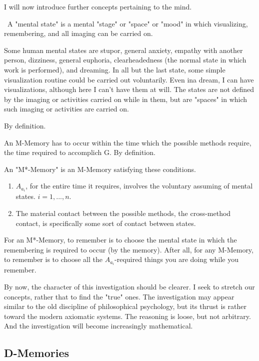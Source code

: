 \documentclass[10pt,twoside,draft]{memoir}
\begin{document}
{{I will now introduce further concepts pertaining to the mind. 

\ A "mental state" is a mental "stage" or "space" or "mood" 
in which visualizing, remembering, and all imaging can be carried on. 

Some human mental states are stupor, general anxiety, empathy with 
another person, dizziness, general euphoria, clearheadedness (the normal 
state in which work is performed), and dreaming. In all but the last state, 
some simple visualization routine could be carried out voluntarily. Even ina 
dream, I can have visualizations, although here I can't have them at will. The 
states are not defined by the imaging or activities carried on while in them, 
but are "spaces" in which such imaging or activities are carried on. 

By definition. 

 An M-Memory has to occur within the time which the 
possible methods require, the time required to accomplich G. By definition. 

 An "M*-Memory" is an M-Memory satisfying these 
conditions. 
\begin{enumerate}
\item $A_{a_i}$, for the entire time it requires, involves the voluntary 
assuming of mental states. $i=1,...,n$.
\item The material contact between the 
possible methods, the cross-method contact, is specifically some sort of 
contact between states. 
\end{enumerate}

 For an M*-Memory, to remember is to choose the 
mental state in which the remembering is required to occur (by the 
memory). After all, for any M-Memory, to remember is to choose all the 
$A_{a_i}$-required things you are doing while you remember. 

By now, the character of this investigation should be clearer. I seek to 
stretch our concepts, rather that to find the "true" ones. The investigation 
may appear similar to the old discipline of philosophical psychology, but its 
thrust is rather toward the modern axiomatic systems. The reasoning is 
loose, but not arbitrary. And the investigation will become increasingly 
mathematical. 


\subsection{D-Memories}

}}
\end{document}
